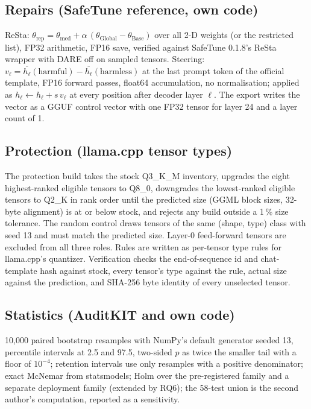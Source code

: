 \subsection{Repairs (SafeTune reference, own code)}
ReSta: $\theta_{\mathrm{rep}} = \theta_{\mathrm{med}} + \alpha\,(\theta_{\mathrm{Global}} - \theta_{\mathrm{Base}})$ over all 2-D weights (or the restricted list), FP32 arithmetic, FP16 save, verified against SafeTune 0.1.8's ReSta wrapper with DARE off on sampled tensors. Steering: $v_\ell = \overline{h_\ell}(\text{harmful}) - \overline{h_\ell}(\text{harmless})$ at the last prompt token of the official template, FP16 forward passes, float64 accumulation, no normalisation; applied as $h_\ell \leftarrow h_\ell + s\,v_\ell$ at every position after decoder layer $\ell$. The export writes the vector as a GGUF control vector with one FP32 tensor for layer 24 and a layer count of 1.

\subsection{Protection (llama.cpp tensor types)}
The protection build takes the stock Q3\_K\_M inventory, upgrades the eight highest-ranked eligible tensors to Q8\_0, downgrades the lowest-ranked eligible tensors to Q2\_K in rank order until the predicted size (GGML block sizes, 32-byte alignment) is at or below stock, and rejects any build outside a 1\,\% size tolerance. The random control draws tensors of the same (shape, type) class with seed 13 and must match the predicted size. Layer-0 feed-forward tensors are excluded from all three roles. Rules are written as per-tensor type rules for llama.cpp's quantizer. Verification checks the end-of-sequence id and chat-template hash against stock, every tensor's type against the rule, actual size against the prediction, and SHA-256 byte identity of every unselected tensor.

\subsection{Statistics (AuditKIT and own code)}
10,000 paired bootstrap resamples with NumPy's default generator seeded 13, percentile intervals at 2.5 and 97.5, two-sided $p$ as twice the smaller tail with a floor of $10^{-4}$; retention intervals use only resamples with a positive denominator; exact McNemar from statsmodels; Holm over the pre-registered family and a separate deployment family (extended by RQ6); the 58-test union is the second author's computation, reported as a sensitivity.

